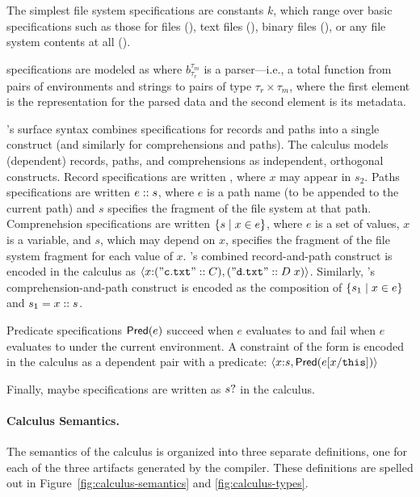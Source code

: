 The simplest file system specifications are constants $k$, which range
over basic specifications such as those for files (\pfile), text files
(\ptext), binary files (\pbin), or any file system contents at all
(\pany).

\padshaskell{} specifications are modeled as  where
$b^{\tau_m}_{\tau_r}$ is a parser---i.e., a total function from pairs
of environments and strings to pairs of type $\tau_r \times \tau_m$,
where the first element is the representation for the parsed data and
the second element is its metadata.

\forest{}'s surface syntax combines specifications for records and
paths into a single construct (and similarly for comprehensions and
paths). The calculus models (dependent) records, paths, and
comprehensions as independent, orthogonal constructs.  Record
specifications are written , where $x$ may appear
in $s_2$.  Paths specifications are written $e \mathrel{::} s$, where $e$
is a path name (to be appended to the current path) and $s$ specifies
the fragment of the file system at that path. Comprenehsion
specifications are written $\{ s \mid x \in e \}$, where $e$ is a set of
values, $x$ is a variable, and $s$, which may depend on $x$, specifies
the fragment of the file system fragment for each value of $x$.
\forest{}'s combined record-and-path construct  is encoded in the calculus as
$\langle x {:} (\mathtt{"c.txt"} \mathrel{::} C), (\mathtt{"d.txt"} \mathrel{::} D\;
    x) \rangle$.  Similarly, \forest{}'s comprehension-and-path construct
\cd{[x :: s | x <- e]} is encoded as the composition of
$\{ s_1 \mid x \in e \}$ and $s_1 = x \mathrel{::} s$.

Predicate specifications $\mathsf{Pred}(e)$ succeed when $e$ evaluates to
\True{} and fail when $e$ evaluates to \False under the current
environment.  A \forest{} constraint of the form  is
encoded in the calculus as a dependent pair with a predicate:
$\langle x {:} s, \mathsf{Pred}(e[x/\mathtt{this}]) \rangle$

Finally, maybe specifications are written as $s?$ in the
calculus.

\paragraph*{Calculus Semantics.}
%
The semantics of the calculus is organized into three separate
definitions, one for each of the three artifacts generated by the
\forest{} compiler. These definitions are spelled out in
Figure~\ref{fig:calculus-semantics} and \ref{fig:calculus-types}.

